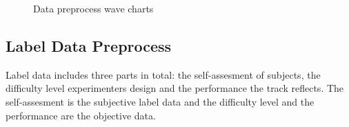 \documentclass[runningheads,a4paper]{llncs}
\begin{document}
\begin{figure}
  \centering




  \caption{Data preprocess wave charts}
  \label{fig:wave} %
\end{figure}

\subsection{Label Data Preprocess}
Label data includes three parts in total: the self-assesment of subjects, the difficulty
level experimenters design and the performance the track reflects. The self-assesment
is the subjective label data and the difficulty level and the performance are the
objective data.
\end{document}
